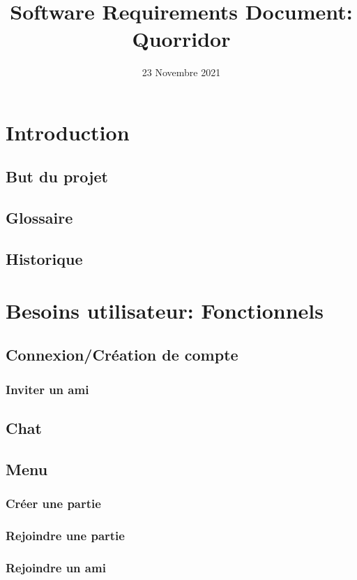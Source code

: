 \documentclass[utf8]{article}
\title{Software Requirements Document: \\ Quorridor}
\author{}
\date{23 Novembre 2021}
\begin{document}
\maketitle
\newpage
\tableofcontents

\newpage

\section{Introduction}
  \subsection{But du projet}
  \subsection{Glossaire}
  \subsection{Historique}


\section{Besoins utilisateur: Fonctionnels}
  \subsection{Connexion/Création de compte}
    \subsubsection{Inviter un ami}
  \subsection{Chat}
  \subsection{Menu}
    \subsubsection{Créer une partie}
    \subsubsection{Rejoindre une partie}
    \subsubsection{Rejoindre un ami}
\end{document}
